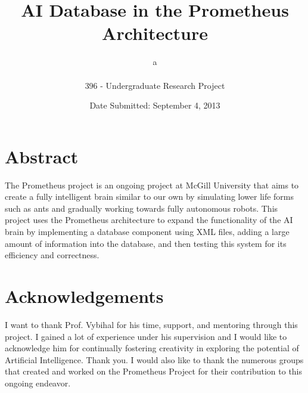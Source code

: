 \documentclass[titlepage, 12pt]{article}
\begin{document}
\title{{\bf AI Database in the Prometheus Architecture}}
 
\vspace{5 mm} 
\author{
          a \\\\
                396 - Undergraduate Research Project
          }
\date{Date Submitted: September 4, 2013}

\maketitle

\clearpage
\thispagestyle{empty}

\section*{Abstract}
\noindent The Prometheus project is an ongoing project at McGill University that aims to create a fully intelligent brain similar to our own by simulating lower life forms such as ants and gradually working towards fully autonomous robots. This project uses the Prometheus architecture to expand the functionality of the AI brain by implementing a database component using XML files, adding a large amount of information into the database, and then testing this system for its efficiency and correctness.


\section*{Acknowledgements}
\noindent I want to thank Prof. Vybihal for his time, support, and mentoring through this project. I gained a lot of experience under his supervision and I would like to acknowledge him for continually fostering creativity in exploring the potential of Artificial Intelligence. Thank you.  I would also like to thank the numerous groups that created and worked on the Prometheus Project for their contribution to this ongoing endeavor.
\end{document}
